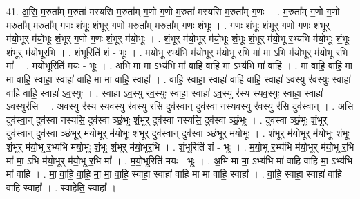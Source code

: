 \documentclass[17pt]{extarticle}
\begin{document}
41. अ॒सि॒ म॒रुता᳚म् म॒रुता॑ मस्यसि म॒रुता᳚म् ग॒णो ग॒णो म॒रुता॑ मस्यसि म॒रुता᳚म् ग॒णः । . म॒रुता᳚म् ग॒णो ग॒णो म॒रुता᳚म् म॒रुता᳚म् ग॒णः शं॒भूः शं॒भूर् ग॒णो म॒रुता᳚म् म॒रुता᳚म् ग॒णः शं॒भूः । . ग॒णः शं॒भूः शं॒भूर् ग॒णो ग॒णः शं॒भूर् म॑यो॒भूर् म॑यो॒भूः शं॒भूर् ग॒णो ग॒णः शं॒भूर् म॑यो॒भूः । . शं॒भूर् म॑यो॒भूर् म॑यो॒भूः शं॒भूः शं॒भूर् म॑यो॒भू र॒भ्य॑भि म॑यो॒भूः शं॒भूः शं॒भूर् म॑यो॒भूर॒भि । . शं॒भूरिति॑ शं - भूः । . म॒यो॒भू र॒भ्य॑भि म॑यो॒भूर् म॑यो॒भू र॒भि मा॑ मा॒ ऽभि म॑यो॒भूर् म॑यो॒भू र॒भि मा᳚ । . म॒यो॒भूरिति॑ मयः - भूः । . अ॒भि मा॑ मा॒ ऽभ्य॑भि मा॑ वाहि वाहि मा॒ ऽभ्य॑भि मा॑ वाहि । . मा॒ वा॒हि॒ वा॒हि॒ मा॒ मा॒ वा॒हि॒ स्वाहा॒ स्वाहा॑ वाहि मा मा वाहि॒ स्वाहा᳚ । . वा॒हि॒ स्वाहा॒ स्वाहा॑ वाहि वाहि॒ स्वाहा॑ ऽव॒स्यु र॑व॒स्युः स्वाहा॑ वाहि वाहि॒ स्वाहा॑ ऽव॒स्युः । . स्वाहा॑ ऽव॒स्यु र॑व॒स्युः स्वाहा॒ स्वाहा॑ ऽव॒स्यु र॑स्य स्यव॒स्युः स्वाहा॒ स्वाहा॑ ऽव॒स्युर॑सि । . अ॒व॒स्यु र॑स्य स्यव॒स्यु र॑व॒स्यु र॑सि॒ दुव॑स्वा॒न् दुव॑स्वा नस्यव॒स्यु र॑व॒स्यु र॑सि॒ दुव॑स्वान् । . अ॒सि॒ दुव॑स्वा॒न् दुव॑स्वा नस्यसि॒ दुव॑स्वा ञ्छं॒भूः शं॒भूर् दुव॑स्वा नस्यसि॒ दुव॑स्वा ञ्छं॒भूः । . दुव॑स्वा ञ्छं॒भूः शं॒भूर् दुव॑स्वा॒न् दुव॑स्वा ञ्छं॒भूर् म॑यो॒भूर् म॑यो॒भूः शं॒भूर् दुव॑स्वा॒न् दुव॑स्वा ञ्छं॒भूर् म॑यो॒भूः । . शं॒भूर् म॑यो॒भूर् म॑यो॒भूः शं॒भूः शं॒भूर् म॑यो॒भू र॒भ्य॑भि म॑यो॒भूः शं॒भूः शं॒भूर् म॑यो॒भूर॒भि । . शं॒भूरिति॑ शं - भूः । . म॒यो॒भू र॒भ्य॑भि म॑यो॒भूर् म॑यो॒भू र॒भि मा॑ मा॒ ऽभि म॑यो॒भूर् म॑यो॒भू र॒भि मा᳚ । . म॒यो॒भूरिति॑ मयः - भूः । . अ॒भि मा॑ मा॒ ऽभ्य॑भि मा॑ वाहि वाहि मा॒ ऽभ्य॑भि मा॑ वाहि । . मा॒ वा॒हि॒ वा॒हि॒ मा॒ मा॒ वा॒हि॒ स्वाहा॒ स्वाहा॑ वाहि मा मा वाहि॒ स्वाहा᳚ । . वा॒हि॒ स्वाहा॒ स्वाहा॑ वाहि वाहि॒ स्वाहा᳚ । . स्वाहेति॒ स्वाहा᳚ । \newline
\pagebreak
{}
\end{document}
